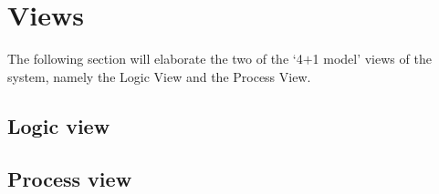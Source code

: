 
\section{Views}
The following section will elaborate the two of the `4$+$1 model' views of the system, namely the Logic View and the Process View.

\subsection{Logic view}

\subsection{Process view}